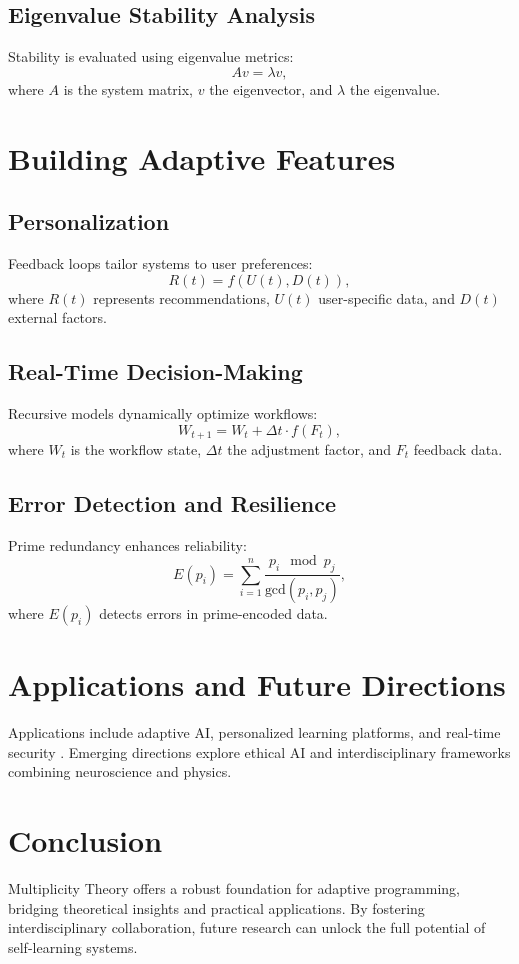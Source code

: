\documentclass{article}
\theoremstyle{plain}
\begin{document}
\subsection{Eigenvalue Stability Analysis}
Stability is evaluated using eigenvalue metrics:
\begin{equation}
Av = \lambda v,
\end{equation}
where $A$ is the system matrix, $v$ the eigenvector, and $\lambda$ the eigenvalue.

\section{Building Adaptive Features}
\subsection{Personalization}
Feedback loops tailor systems to user preferences:\begin{equation}
R(t) = f(U(t), D(t)),
\end{equation}
where $R(t)$ represents recommendations, $U(t)$ user-specific data, and $D(t)$ external factors.

\subsection{Real-Time Decision-Making}
Recursive models dynamically optimize workflows:
\begin{equation}
W_{t+1} = W_t + \Delta t \cdot f(F_t),
\end{equation}
where $W_t$ is the workflow state, $\Delta t$ the adjustment factor, and $F_t$ feedback data.

\subsection{Error Detection and Resilience}
Prime redundancy enhances reliability:
\begin{equation}
E(p_i) = \sum_{i=1}^n \frac{p_i \mod p_j}{\text{gcd}(p_i, p_j)},
\end{equation}
where $E(p_i)$ detects errors in prime-encoded data.

\section{Applications and Future Directions}
Applications include adaptive AI, personalized learning platforms, and real-time security \cite{adadi2019explainable}. Emerging directions explore ethical AI and interdisciplinary frameworks combining neuroscience and physics.

\section{Conclusion}
Multiplicity Theory offers a robust foundation for adaptive programming, bridging theoretical insights and practical applications. By fostering interdisciplinary collaboration, future research can unlock the full potential of self-learning systems.



\end{document}
